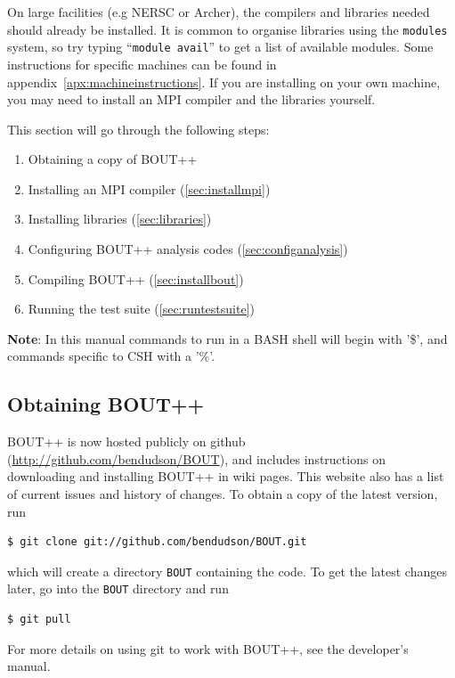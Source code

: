 \documentclass[12pt]{article}
\begin{document}
On large facilities (e.g NERSC or Archer), the compilers and libraries needed
should already be installed. It is common to organise libraries using the
\texttt{modules} system, so try typing ``\texttt{module avail}'' to get a list
of available modules. Some instructions for specific machines can be found in
appendix~\ref{apx:machineinstructions}.  If you are installing on your own
machine, you may need to install an MPI compiler and the libraries yourself.

This section will go through the following steps:
%
\begin{enumerate}
\item Obtaining a copy of BOUT++
\item Installing an MPI compiler (\ref{sec:installmpi})
\item Installing libraries (\ref{sec:libraries})
\item Configuring BOUT++ analysis codes (\ref{sec:configanalysis})
\item Compiling BOUT++ (\ref{sec:installbout})
\item Running the test suite (\ref{sec:runtestsuite})
\end{enumerate}
%
{\bf Note}: In this manual commands to run in a BASH shell will begin with
'\$', and commands specific to CSH with a '\%'.



\subsection{Obtaining BOUT++}
%
BOUT++ is now hosted publicly on github
(\url{http://github.com/bendudson/BOUT}), and includes instructions on
downloading and installing BOUT++ in wiki pages. This website also has a list
of current  issues and history of changes. To obtain a copy of the latest
version, run
%
%
\begin{verbatim}
$ git clone git://github.com/bendudson/BOUT.git
\end{verbatim}
%
which will create a directory \texttt{BOUT} containing the code. To get the
latest changes later, go into the  \texttt{BOUT} directory and run
%
\begin{verbatim}
$ git pull
\end{verbatim}
%
For more details on using git to work with BOUT++, see the developer's manual.
\end{document}
